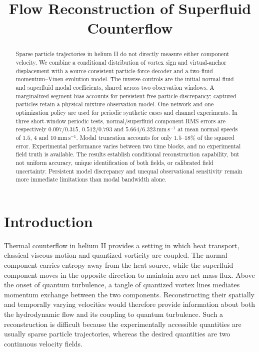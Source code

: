 \documentclass[11pt]{article}
\title{Flow Reconstruction of Superfluid Counterflow}
\author{}
\date{}
\numberwithin{equation}{section}
\begin{document}
\maketitle

\begin{abstract}
Sparse particle trajectories in helium II do not directly measure either component velocity. We combine a conditional distribution of vortex sign and virtual-anchor displacement with a source-consistent particle-force decoder and a two-fluid momentum--Vinen evolution model. The inverse controls are the initial normal-fluid and superfluid modal coefficients, shared across two observation windows. A marginalized segment bias accounts for persistent free-particle discrepancy; captured particles retain a physical mixture observation model. One network and one optimization policy are used for periodic synthetic cases and channel experiments. In three short-window periodic tests, normal/superfluid component RMS errors are respectively $0.097/0.315$, $0.512/0.793$ and $5.664/6.323\,\mathrm{mm\,s^{-1}}$ at mean normal speeds of $1.5$, $4$ and $10\,\mathrm{mm\,s^{-1}}$. Modal truncation accounts for only $1.5$--$18\%$ of the squared error. Experimental performance varies between two time blocks, and no experimental field truth is available. The results establish conditional reconstruction capability, but not uniform accuracy, unique identification of both fields, or calibrated field uncertainty. Persistent model discrepancy and unequal observational sensitivity remain more immediate limitations than modal bandwidth alone.
\end{abstract}

\section{Introduction}
\label{sec:introduction}

Thermal counterflow in helium II provides a setting in which heat transport, classical viscous motion and quantized vorticity are coupled. The normal component carries entropy away from the heat source, while the superfluid component moves in the opposite direction to maintain zero net mass flux. Above the onset of quantum turbulence, a tangle of quantized vortex lines mediates momentum exchange between the two components. Reconstructing their spatially and temporally varying velocities would therefore provide information about both the hydrodynamic flow and its coupling to quantum turbulence. Such a reconstruction is difficult because the experimentally accessible quantities are usually sparse particle trajectories, whereas the desired quantities are two continuous velocity fields.
\end{document}
